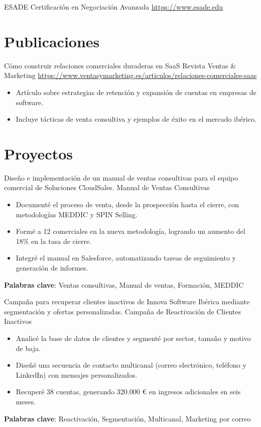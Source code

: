 \documentclass[a4paper, serif, 10pt]{moderncv}
\begin{document}
        {ESADE}
        {Certificación en Negociación Avanzada}
        {\url{https://www.esade.edu}}
        {}
        {}
\section{Publicaciones}

        {Cómo construir relaciones comerciales duraderas en SaaS}
        {Revista Ventas \& Marketing}
        {\url{https://www.ventasymarketing.es/articulos/relaciones-comerciales-saas}}
        {}
        {\begin{itemize}
\item Artículo sobre estrategias de retención y expansión de cuentas en empresas de software.
\item Incluye tácticas de venta consultiva y ejemplos de éxito en el mercado ibérico.
\end{itemize}}
\section{Proyectos}

        {Diseño e implementación de un manual de ventas consultivas para el equipo comercial de Soluciones CloudSales.}
        {Manual de Ventas Consultivas}
        {}
        {}
        {\begin{itemize}
\item Documenté el proceso de venta, desde la prospección hasta el cierre, con metodologías MEDDIC y SPIN Selling.
\item Formé a 12 comerciales en la nueva metodología, logrando un aumento del 18\% en la tasa de cierre.
\item Integré el manual en Salesforce, automatizando tareas de seguimiento y generación de informes.
\end{itemize}
\textbf{Palabras clave}: Ventas consultivas, Manual de ventas, Formación, MEDDIC}

        {Campaña para recuperar clientes inactivos de Innova Software Ibérica mediante segmentación y ofertas personalizadas.}
        {Campaña de Reactivación de Clientes Inactivos}
        {}
        {}
        {\begin{itemize}
\item Analicé la base de datos de clientes y segmenté por sector, tamaño y motivo de baja.
\item Diseñé una secuencia de contacto multicanal (correo electrónico, teléfono y LinkedIn) con mensajes personalizados.
\item Recuperé 38 cuentas, generando 320.000 € en ingresos adicionales en seis meses.
\end{itemize}
\textbf{Palabras clave}: Reactivación, Segmentación, Multicanal, Marketing por correo}
\end{document}
